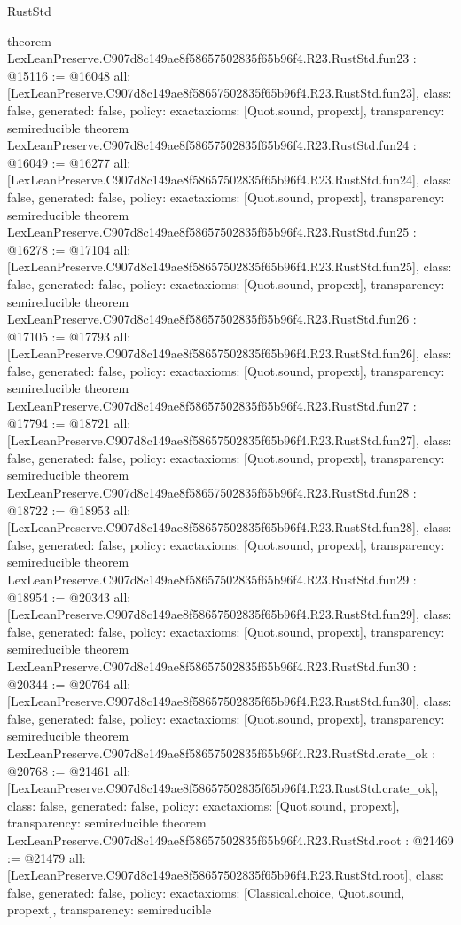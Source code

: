 \begin{lexlean}{RustStd}
\begin{coremodule}
{}
theorem LexLeanPreserve.C907d8c149ae8f58657502835f65b96f4.R23.RustStd.fun23 : @15116 := @16048 {
  all: [LexLeanPreserve.C907d8c149ae8f58657502835f65b96f4.R23.RustStd.fun23],
  class: false,
  generated: false,
  policy: exact{axioms: [Quot.sound, propext]},
  transparency: semireducible
}
theorem LexLeanPreserve.C907d8c149ae8f58657502835f65b96f4.R23.RustStd.fun24 : @16049 := @16277 {
  all: [LexLeanPreserve.C907d8c149ae8f58657502835f65b96f4.R23.RustStd.fun24],
  class: false,
  generated: false,
  policy: exact{axioms: [Quot.sound, propext]},
  transparency: semireducible
}
theorem LexLeanPreserve.C907d8c149ae8f58657502835f65b96f4.R23.RustStd.fun25 : @16278 := @17104 {
  all: [LexLeanPreserve.C907d8c149ae8f58657502835f65b96f4.R23.RustStd.fun25],
  class: false,
  generated: false,
  policy: exact{axioms: [Quot.sound, propext]},
  transparency: semireducible
}
theorem LexLeanPreserve.C907d8c149ae8f58657502835f65b96f4.R23.RustStd.fun26 : @17105 := @17793 {
  all: [LexLeanPreserve.C907d8c149ae8f58657502835f65b96f4.R23.RustStd.fun26],
  class: false,
  generated: false,
  policy: exact{axioms: [Quot.sound, propext]},
  transparency: semireducible
}
theorem LexLeanPreserve.C907d8c149ae8f58657502835f65b96f4.R23.RustStd.fun27 : @17794 := @18721 {
  all: [LexLeanPreserve.C907d8c149ae8f58657502835f65b96f4.R23.RustStd.fun27],
  class: false,
  generated: false,
  policy: exact{axioms: [Quot.sound, propext]},
  transparency: semireducible
}
theorem LexLeanPreserve.C907d8c149ae8f58657502835f65b96f4.R23.RustStd.fun28 : @18722 := @18953 {
  all: [LexLeanPreserve.C907d8c149ae8f58657502835f65b96f4.R23.RustStd.fun28],
  class: false,
  generated: false,
  policy: exact{axioms: [Quot.sound, propext]},
  transparency: semireducible
}
theorem LexLeanPreserve.C907d8c149ae8f58657502835f65b96f4.R23.RustStd.fun29 : @18954 := @20343 {
  all: [LexLeanPreserve.C907d8c149ae8f58657502835f65b96f4.R23.RustStd.fun29],
  class: false,
  generated: false,
  policy: exact{axioms: [Quot.sound, propext]},
  transparency: semireducible
}
theorem LexLeanPreserve.C907d8c149ae8f58657502835f65b96f4.R23.RustStd.fun30 : @20344 := @20764 {
  all: [LexLeanPreserve.C907d8c149ae8f58657502835f65b96f4.R23.RustStd.fun30],
  class: false,
  generated: false,
  policy: exact{axioms: [Quot.sound, propext]},
  transparency: semireducible
}
theorem LexLeanPreserve.C907d8c149ae8f58657502835f65b96f4.R23.RustStd.crate_ok : @20768 := @21461 {
  all: [LexLeanPreserve.C907d8c149ae8f58657502835f65b96f4.R23.RustStd.crate_ok],
  class: false,
  generated: false,
  policy: exact{axioms: [Quot.sound, propext]},
  transparency: semireducible
}
theorem LexLeanPreserve.C907d8c149ae8f58657502835f65b96f4.R23.RustStd.root : @21469 := @21479 {
  all: [LexLeanPreserve.C907d8c149ae8f58657502835f65b96f4.R23.RustStd.root],
  class: false,
  generated: false,
  policy: exact{axioms: [Classical.choice, Quot.sound, propext]},
  transparency: semireducible
}


\end{coremodule}
\end{lexlean}
